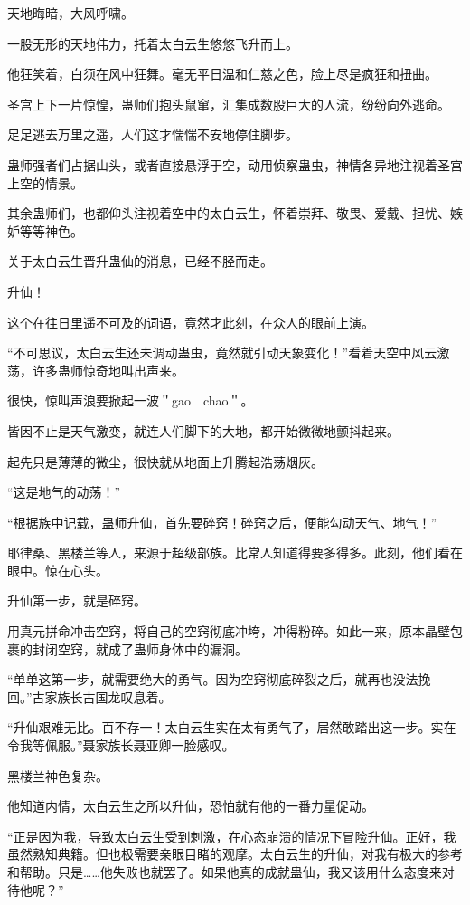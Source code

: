 
\begin{this_body}

天地晦暗，大风呼啸。

一股无形的天地伟力，托着太白云生悠悠飞升而上。

他狂笑着，白须在风中狂舞。毫无平日温和仁慈之色，脸上尽是疯狂和扭曲。

圣宫上下一片惊惶，蛊师们抱头鼠窜，汇集成数股巨大的人流，纷纷向外逃命。

足足逃去万里之遥，人们这才惴惴不安地停住脚步。

蛊师强者们占据山头，或者直接悬浮于空，动用侦察蛊虫，神情各异地注视着圣宫上空的情景。

其余蛊师们，也都仰头注视着空中的太白云生，怀着崇拜、敬畏、爱戴、担忧、嫉妒等等神色。

关于太白云生晋升蛊仙的消息，已经不胫而走。

升仙！

这个在往日里遥不可及的词语，竟然才此刻，在众人的眼前上演。

“不可思议，太白云生还未调动蛊虫，竟然就引动天象变化！”看着天空中风云激荡，许多蛊师惊奇地叫出声来。

很快，惊叫声浪要掀起一波＂gao　chao＂。

皆因不止是天气激变，就连人们脚下的大地，都开始微微地颤抖起来。

起先只是薄薄的微尘，很快就从地面上升腾起浩荡烟灰。

“这是地气的动荡！”

“根据族中记载，蛊师升仙，首先要碎窍！碎窍之后，便能勾动天气、地气！”

耶律桑、黑楼兰等人，来源于超级部族。比常人知道得要多得多。此刻，他们看在眼中。惊在心头。

升仙第一步，就是碎窍。

用真元拼命冲击空窍，将自己的空窍彻底冲垮，冲得粉碎。如此一来，原本晶壁包裹的封闭空窍，就成了蛊师身体中的漏洞。

“单单这第一步，就需要绝大的勇气。因为空窍彻底碎裂之后，就再也没法挽回。”古家族长古国龙叹息着。

“升仙艰难无比。百不存一！太白云生实在太有勇气了，居然敢踏出这一步。实在令我等佩服。”聂家族长聂亚卿一脸感叹。

黑楼兰神色复杂。

他知道内情，太白云生之所以升仙，恐怕就有他的一番力量促动。

“正是因为我，导致太白云生受到刺激，在心态崩溃的情况下冒险升仙。正好，我虽然熟知典籍。但也极需要亲眼目睹的观摩。太白云生的升仙，对我有极大的参考和帮助。只是……他失败也就罢了。如果他真的成就蛊仙，我又该用什么态度来对待他呢？”


\end{this_body}
